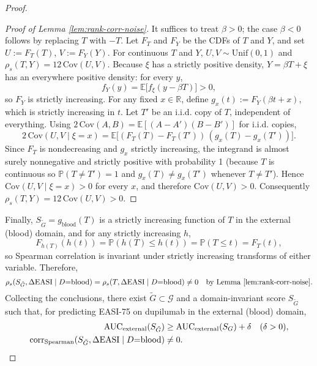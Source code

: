 \begin{proof}
\begin{proof}[Proof of Lemma \ref{lem:rank-corr-noise}]
It suffices to treat \(\beta>0\); the case \(\beta<0\) follows by replacing \(T\) with \(-T\). Let \(F_T\) and \(F_Y\) be the CDFs of \(T\) and \(Y\), and set \(U:=F_T(T)\), \(V:=F_Y(Y)\). For continuous \(T\) and \(Y\), \(U,V\sim\mathrm{Unif}(0,1)\) and \(\rho_s(T,Y)=12\,\mathrm{Cov}(U,V)\). Because \(\xi\) has a strictly positive density, \(Y=\beta T+\xi\) has an everywhere positive density: for every \(y\),
\[
 f_Y(y)=\mathbb E\big[f_\xi(y-\beta T)\big]>0,
\]
so \(F_Y\) is strictly increasing. For any fixed \(x\in\mathbb R\), define \(g_x(t):=F_Y(\beta t+x)\), which is strictly increasing in \(t\). Let \(T'\) be an i.i.d. copy of \(T\), independent of everything. Using \(2\,\mathrm{Cov}(A,B)=\mathbb{E}[(A-A')(B-B')]\) for i.i.d. copies,
\[
2\,\mathrm{Cov}(U,V\mid\xi{=}x)=\mathbb{E}\big[(F_T(T)-F_T(T'))\,(g_x(T)-g_x(T'))\big].
\]
Since \(F_T\) is nondecreasing and \(g_x\) strictly increasing, the integrand is almost surely nonnegative and strictly positive with probability 1 (because \(T\) is continuous so \(\mathbb P(T\neq T')=1\) and \(g_x(T)\neq g_x(T')\) whenever \(T\neq T'\)). Hence \(\mathrm{Cov}(U,V\mid\xi{=}x)>0\) for every \(x\), and therefore \(\mathrm{Cov}(U,V)>0\). Consequently \(\rho_s(T,Y)=12\,\mathrm{Cov}(U,V)>0\).
\end{proof}

Finally, \(S_{\tilde G}=g_{\text{blood}}(T)\) is a strictly increasing function of \(T\) in the external (blood) domain, and for any strictly increasing \(h\),
\[
F_{h(T)}(h(t))=\mathbb{P}(h(T)\le h(t))=\mathbb{P}(T\le t)=F_T(t),
\]
so Spearman correlation is invariant under strictly increasing transforms of either variable. Therefore,
\[
\rho_s(S_{\tilde G},\Delta\mathrm{EASI}\mid D{=}\text{blood})=\rho_s(T,\Delta\mathrm{EASI}\mid D{=}\text{blood})\neq 0\quad\text{by Lemma \ref{lem:rank-corr-noise}}.
\]
Collecting the conclusions, there exist \(\tilde G\subset\mathcal G\) and a domain-invariant score \(S_{\tilde G}\) such that, for predicting EASI-75 on dupilumab in the external (blood) domain,
\[
\begin{aligned}
\mathrm{AUC}_{\text{external}}(S_{\tilde G}) &\ge \mathrm{AUC}_{\text{external}}(S_G)+\delta\quad(\delta>0),\\
\mathrm{corr}_{\text{Spearman}}(S_{\tilde G},\Delta\mathrm{EASI}\mid D{=}\text{blood}) &\ne 0.\;\qedhere
\end{aligned}
\]
\end{proof}

